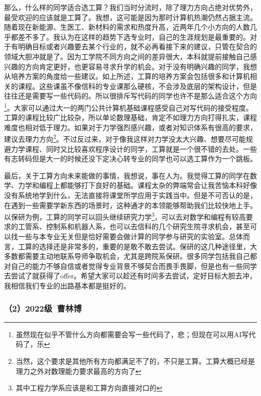 \documentclass[11pt,oneside]{book}
\begin{document}
\vspace{10pt}

那么，什么样的同学适合选工算？我们当时分流时，除了理力方向占绝对优势外，最受欢迎的应该就是工算了。我想，这可能是因为那时计算机热潮仍然占据主流。随着现在新能源、生医工、新材料的需求和热度升高，近两年几个小方向的人数几乎都差不多了。我认为在这样的趋势下选专业时，自己的生涯规划是最重要的。对于有明确目标或者兴趣要去某个行业的，就不必再看接下来的建议，只管在契合的领域大胆冲就是了。因为工学院不同方向之间的差异很大，本科就提前接触自己感兴趣的方向肯定更好，也更容易寻求升学的机会。对于没有明确兴趣的同学，我想从培养方案的角度给一些建议。如上所述，工算的培养方案会包括很多和计算机相关的课程。这些课虽不像信科的专业课那么硬核，不会涉及底层的架构设计，但是往往还是需要写一些代码的。所以很排斥写代码的同学也许不是那么适合这个方向\footnote{虽然现在似乎不管什么方向都需要会写一些代码了，悲；但现在可以用AI写代码了，乐}。大家可以通过大一的两门公共计算机基础课程感受自己对写代码的接受程度。工算的课程比较广比较杂，所以单论数理基础，肯定不如理力方向打得扎实，课程难度也相对低于理力。如果对于力学强烈感兴趣，或者对知识体系有很高的要求，建议去理力方向\footnote{当然，这个要求是其他所有方向都满足不了的，不只是工算。工算大概已经是理力之外对数理能力要求最高的方向了}。不过反过来，对于像我这样对力学没太大兴趣、想要尽可能规避力学课程、同时又比较喜欢程序设计的同学，工算就是一个很不错的去处。一些有志转码但是大一的时候还没下定决心转专业的同学也可以选工算作为一个跳板。

\vspace{10pt}

最后，关于工算方向未来能做的事情，我想说，事在人为。我觉得工算的同学在数学、力学和编程上都能够打下良好的基础。课程太杂的弊端常会让我苦恼本科好像没有系统地学到什么，无法直接将课堂所学应用于实践当中。但是不可否认的是，在遇到一些需要学新东西的场景时，这种通才的本领能够帮助我们比较快地上手。以保研为例，工算的同学可以回头继续研究力学\footnote{其中工程力学系应该是和工算方向直接对口的}，可以去对数学和编程有较高要求的工管系、控制系和机器人系，也可以去信科的几个研究生院寻求机会，甚至可以找一些与本专业无关但是恰好需要会做计算的同学参与研究的实验室。总体而言，工算的选择还是非常多的，重要的是敢不敢去尝试。保研的这几种途径里，大多数都需要主动地联系导师争取机会，尤其是跨院系保研。很多同学包括我自己都对自己的能力不够自信或者觉得专业背景不够契合而畏手畏脚，但是也有一些同学去尝试了就获得了offer。希望大家可以趁还有时间多去尝试，定好目标大胆去冲，我相信我们专业的出路基本都是挺好的。
\subsubsection{（2）2022级\ 曹林博}
\end{document}
